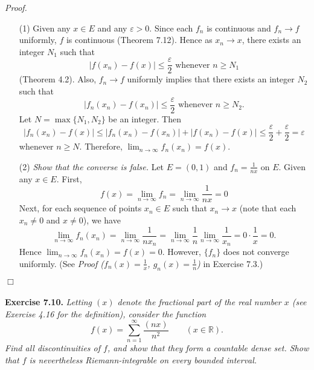 \documentclass{article}
\begin{document}
\emph{Proof.}
\begin{enumerate}
  \item[(1)]
  Given any $x \in E$ and any $\varepsilon > 0$.
  Since each $f_n$ is continuous and $f_n \to f$ uniformly,
  $f$ is continuous (Theorem 7.12).
  Hence as $x_n \to x$, there exists an integer $N_1$
  such that
  \[
    |f(x_n) - f(x)| \leq \frac{\varepsilon}{2}
    \text{ whenever } n \geq N_1
  \]
  (Theorem 4.2).
  Also, $f_n \to f$ uniformly implies that there exists an integer $N_2$
  such that
  \[
    |f_n(x_n) - f(x_n)| \leq \frac{\varepsilon}{2}
    \text{ whenever } n \geq N_2.
  \]
  Let $N = \max\{N_1,N_2\}$ be an integer.
  Then
  \[
    |f_n(x_n) - f(x)|
    \leq |f_n(x_n) - f(x_n)| + |f(x_n) - f(x)|
    \leq \frac{\varepsilon}{2} + \frac{\varepsilon}{2}
    = \varepsilon
  \]
  whenever $n \geq N$.
  Therefore, $\lim_{n \to \infty} f_n(x_n) = f(x)$.

  \item[(2)]
  \emph{Show that the converse is false.}
  Let $E = (0,1)$ and $f_n = \frac{1}{nx}$ on $E$.
  Given any $x \in E$.
  First,
  \[
    f(x) = \lim_{n \to \infty} f_n = \lim_{n \to \infty} \frac{1}{nx} = 0
  \]
  Next, for each sequence of points $x_n \in E$ such that $x_n \to x$
  (note that each $x_n \neq 0$ and $x \neq 0$), we have
  \[
    \lim_{n \to \infty} f_n(x_n)
    = \lim_{n \to \infty} \frac{1}{nx_n}
    = \lim_{n \to \infty} \frac{1}{n} \lim_{n \to \infty} \frac{1}{x_n}
    = 0 \cdot \frac{1}{x}
    = 0.
  \]
  Hence $\lim_{n \to \infty} f_n(x_n) = f(x) = 0$.
  However, $\{f_n\}$ does not converge uniformly.
  (See \emph{Proof ($f_n(x) = \frac{1}{x}$, $g_n(x) = \frac{1}{n}$)} in Exercise 7.3.)
\end{enumerate}
$\Box$ \\\\






\textbf{Exercise 7.10.}
\emph{Letting $(x)$ denote the fractional part of the real number $x$
(see Exercise 4.16 for the definition),
consider the function
\[
  f(x) = \sum_{n=1}^{\infty} \frac{(nx)}{n^2}
  \qquad
  (x \in \mathbb{R}).
\]
Find all discontinuities of $f$, and show that they form a countable dense set.
Show that $f$ is nevertheless Riemann-integrable on every bounded interval.} \\
\end{document}
